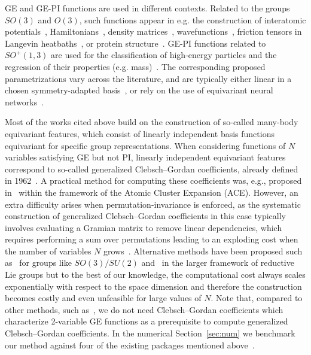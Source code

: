 \documentclass{article}
\numberwithin{equation}{section}
\def\Nat{{N}}
\begin{document}
GE and GE-PI functions are 
used in different contexts. Related to the groups $SO(3)$ and $O(3)$, such functions appear in e.g. the construction of interatomic potentials~\cite{Schutt2018-dw, Drautz2019-mn, Batzner2022-az, Batatia2022-zi}, Hamiltonians~\cite{Zhang2022-ay,Li2022-cj,Zhong2023-ar,Suman2025-qz,Qian2025-du,gong2023general}, density matrices~\cite{Wetherell2020-us,Hazra2024-cy,Zhang2025-ve}, wavefunctions~\cite{zhou2024-wf,unke2021se}, friction tensors in Langevin heatbaths~\cite{Sachs2025}, or protein structure~\cite{lu2024dynamicbind,eismann2021hierarchical}. 
GE-PI functions related to $SO^+(1,3)$ are used for the classification of high-energy particles and the regression of their properties (e.g. mass)~\cite{Bogatskiy2020-jt,Munoz2022-ur,Bogatskiy2024-oc}.
The corresponding proposed parametrizations vary across the literature, and are typically either linear in a chosen symmetry-adapted basis~\cite{Munoz2022-ur,Witt2023-rm,Sachs2025,Zhang2025-ve}, or rely on the use of equivariant neural networks~\cite{Batatia2022-zi,geiger2022e3nn,lu2024dynamicbind}.

Most of the works cited above build on the construction of so-called many-body equivariant features, which consist of linearly independent basis functions equivariant 
for specific group representations.
When considering functions of $\Nat$ variables satisfying GE but not PI, linearly independent equivariant features correspond to so-called generalized Clebsch--Gordan coefficients, already defined in 1962~\cite[Chapter 2]{Yutsis1962-wv}. A practical method for computing these coefficients was, e.g., proposed in~\cite{Dusson2022-ie} within the framework of the Atomic Cluster Expansion (ACE).
However, an extra difficulty arises when permutation-invariance is enforced, as the systematic construction of generalized Clebsch--Gordan coefficients in this case typically involves evaluating a Gramian matrix to remove linear dependencies, 
which requires performing a sum over permutations leading to an exploding cost when the number of variables $\Nat$ grows~\cite{Dusson2022-ie}. Alternative methods have been proposed such as~\cite{Nigam2020-zj,Batatia2022-zi,
Goff2024-sw,geiger2022e3nn,geiger2024accelerate} for groups like $SO(3)/SU(2)$ and~\cite{Batatia2023-us} in the larger framework of reductive Lie groups but to the best of our knowledge, the computational cost always scales exponentially with respect to the space dimension and therefore the construction becomes costly and even unfeasible for large values of $\Nat$. 
Note that, compared to other methods, such as~\cite{Nigam2020-zj,Dusson2022-ie}, we do not need Clebsch--Gordan coefficients which characterize 2-variable GE functions as a prerequisite to compute generalized Clebsch--Gordan coefficients. In the numerical Section~\ref{sec:num} we benchmark our method against four of the existing packages mentioned above~\cite{geiger2022e3nn,Batatia2022-zi,Batatia2023-us,geiger2024accelerate}.
\end{document}
